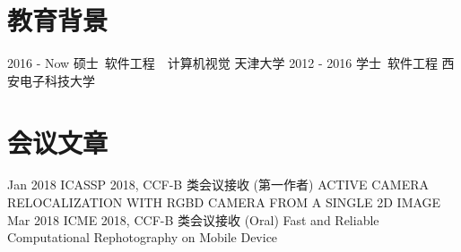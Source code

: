 \documentclass[utf8]{twentysecondcv} %
\begin{document}
\makeprofile %

\section{教育背景}

\begin{twentyshort}
    \twentyitemshort
        {2016 - Now}
        {硕士\ 软件工程\ \ 计算机视觉 \hfill{天津大学}}	
	\twentyitemshort
		{2012 - 2016}
		{学士\ 软件工程 \hfill{西安电子科技大学}}		
\end{twentyshort}




\section{会议文章}

\begin{twenty}
    \twentyitem
        {Jan 2018}
        {}        
        {ICASSP 2018, CCF-B 类会议接收 (第一作者)}
        {}
        {}
        {ACTIVE CAMERA RELOCALIZATION WITH RGBD CAMERA
FROM A SINGLE 2D IMAGE}
    \twentyitem
        {Mar 2018}
        {}        
        {ICME 2018, CCF-B 类会议接收 (Oral)}
        {}
        {}
        {Fast and Reliable Computational Rephotography on Mobile Device}
\end{twenty}
\end{document}
